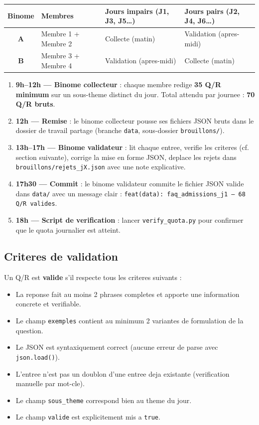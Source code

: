 \documentclass[11pt,a4paper]{article}
\begin{document}
\begin{center}
\begin{tabular}{c l l l}
\toprule
Binome & Membres & Jours impairs (J1, J3, J5\ldots) & Jours pairs (J2, J4, J6\ldots) \\
\midrule
\textbf{A} & Membre 1 + Membre 2 & Collecte (matin) & Validation (apres-midi) \\
\textbf{B} & Membre 3 + Membre 4 & Validation (apres-midi) & Collecte (matin) \\
\bottomrule
\end{tabular}
\end{center}

\begin{databox}
\begin{enumerate}
    \item \textbf{9h--12h --- Binome collecteur} : chaque membre redige \textbf{35 Q/R minimum} sur un sous-theme distinct du jour. Total attendu par journee : \textbf{70 Q/R bruts}.
    \item \textbf{12h --- Remise} : le binome collecteur pousse ses fichiers JSON bruts dans le dossier de travail partage (branche \texttt{data}, sous-dossier \texttt{brouillons/}).
    \item \textbf{13h--17h --- Binome validateur} : lit chaque entree, verifie les criteres (cf. section suivante), corrige la mise en forme JSON, deplace les rejets dans \texttt{brouillons/rejets\_jX.json} avec une note explicative.
    \item \textbf{17h30 --- Commit} : le binome validateur commite le fichier JSON valide dans \texttt{data/} avec un message clair : \texttt{feat(data): faq\_admissions\_j1 -- 68 Q/R valides}.
    \item \textbf{18h --- Script de verification} : lancer \texttt{verify\_quota.py} pour confirmer que le quota journalier est atteint.
\end{enumerate}
\end{databox}

\subsection{Criteres de validation}

Un Q/R est \textbf{valide} s'il respecte tous les criteres suivants :
\begin{itemize}
    \item La reponse fait au moins 2 phrases completes et apporte une information concrete et verifiable.
    \item Le champ \texttt{exemples} contient au minimum 2 variantes de formulation de la question.
    \item Le JSON est syntaxiquement correct (aucune erreur de parse avec \texttt{json.load()}).
    \item L'entree n'est pas un doublon d'une entree deja existante (verification manuelle par mot-cle).
    \item Le champ \texttt{sous\_theme} correspond bien au theme du jour.
    \item Le champ \texttt{valide} est explicitement mis a \texttt{true}.
\end{itemize}
\end{document}
